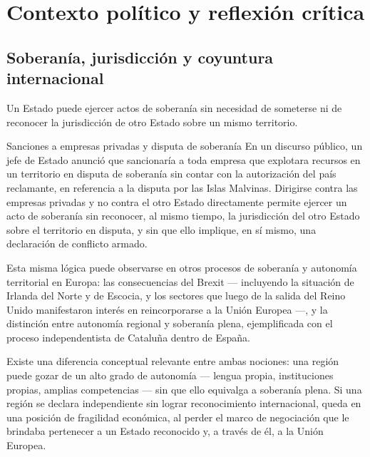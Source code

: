 \documentclass[12pt,oneside]{book}
\begin{document}
\chapter{Contexto político y reflexión crítica}

\section{Soberanía, jurisdicción y coyuntura internacional}


Un Estado puede ejercer actos de soberanía sin necesidad de someterse ni de reconocer la jurisdicción de otro Estado sobre un mismo territorio.

\begin{example}{Sanciones a empresas privadas y disputa de soberanía}
En un discurso público, un jefe de Estado anunció que sancionaría a toda empresa que explotara recursos en un territorio en disputa de soberanía sin contar con la autorización del país reclamante, en referencia a la disputa por las Islas Malvinas. Dirigirse contra las empresas privadas y no contra el otro Estado directamente permite ejercer un acto de soberanía sin reconocer, al mismo tiempo, la jurisdicción del otro Estado sobre el territorio en disputa, y sin que ello implique, en sí mismo, una declaración de conflicto armado.
\end{example}

Esta misma lógica puede observarse en otros procesos de soberanía y autonomía territorial en Europa: las consecuencias del Brexit --- incluyendo la situación de Irlanda del Norte y de Escocia, y los sectores que luego de la salida del Reino Unido manifestaron interés en reincorporarse a la Unión Europea ---, y la distinción entre autonomía regional y soberanía plena, ejemplificada con el proceso independentista de Cataluña dentro de España.

Existe una diferencia conceptual relevante entre ambas nociones: una región puede gozar de un alto grado de autonomía --- lengua propia, instituciones propias, amplias competencias --- sin que ello equivalga a soberanía plena. Si una región se declara independiente sin lograr reconocimiento internacional, queda en una posición de fragilidad económica, al perder el marco de negociación que le brindaba pertenecer a un Estado reconocido y, a través de él, a la Unión Europea.
\end{document}
